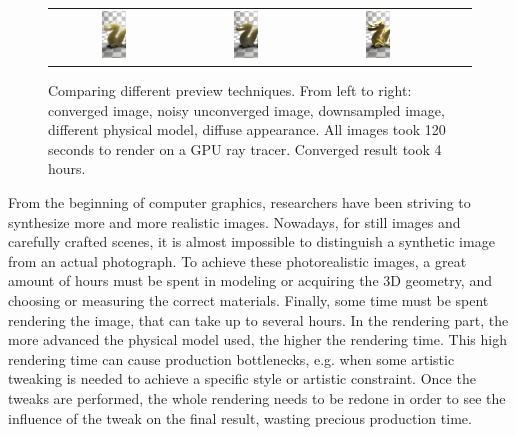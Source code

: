 \begin{figure}
\begin{tabular}{@{}c@{}c@{}c@{}c@{}c@{}}
\includegraphics[width=0.2\textwidth]{figures/thesis_pt_unconverged2}& 	 	 \includegraphics[width=0.2\textwidth]{figures/thesis_pt_sd}& 	 	 \includegraphics[width=0.2\textwidth]{figures/thesis_pt_lambertian} \\
\end{tabular}
\caption{Comparing different preview techniques. From left to right: converged image, noisy unconverged image, downsampled image, different physical model, diffuse appearance. All images took 120 seconds to render on a GPU ray tracer. Converged result took 4 hours.} 
\label{fig:comparison_convergence}
\end{figure}

From the beginning of computer graphics, researchers have been striving to synthesize more and more realistic images. Nowadays, for still images and carefully crafted scenes, it is almost impossible to distinguish a synthetic image from an actual photograph. To achieve these photorealistic images, a great amount of hours must be spent in modeling or acquiring the 3D geometry, and choosing or measuring the correct materials. Finally, some time must be spent rendering the image, that can take up to several hours. In the rendering part, the more advanced the physical model used, the higher the rendering time. This high rendering time can cause production bottlenecks, e.g. when some artistic tweaking is needed to achieve a specific style or artistic constraint. Once the tweaks are performed, the whole rendering needs to be redone in order to see the influence of the tweak on the final result, wasting precious production time. 

